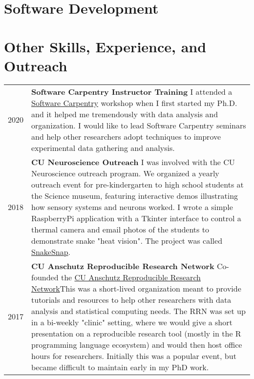 \documentclass[11pt]{article}
\begin{document}
\section*{Software Development}
\label{sec:org6c79908}

\section*{Other Skills, Experience, and Outreach}
\label{sec:org1b2cffe}
\begin{tabular}{lp{}}
2020& \textbf{Software Carpentry Instructor Training} \newline I attended a \href{https://software-carpentry.org/}{Software Carpentry} workshop when I first started my Ph.D. and it helped me tremendously with data analysis and organization. I would like to lead Software Carpentry seminars and help other researchers adopt techniques to improve experimental data gathering and analysis.\\
2018& \textbf{CU Neuroscience Outreach}\newline
I was involved with the CU Neuroscience outreach program. We organized a yearly outreach event for pre-kindergarten to high school students at the Science museum, featuring interactive demos illustrating how sensory systems and neurons worked. I wrote a simple RaspberryPi application with a Tkinter interface to control a thermal camera and email photos of the students to demonstrate snake "heat vision". The project was called \href{https://github.com/nkicg6/thermalsnap}{SnakeSnap}.\\
2017& \textbf{CU Anschutz Reproducible Research Network} \newline Co-founded the \href{https://ucd-reproducible-research-clinic.github.io/members.html}{CU Anschutz Reproducible Research Network}\newline This was a short-lived organization meant to provide tutorials and resources to help other researchers with data analysis and statistical computing needs. The RRN was set up in a bi-weekly "clinic" setting, where we would give a short presentation on a reproducible research tool (mostly in the R programming language ecosystem) and would then host office hours for researchers. Initially this was a popular event, but became difficult to maintain early in my PhD work.\\

\end{tabular}
\end{document}
